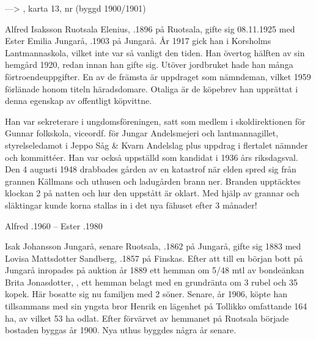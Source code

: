 ---> , karta 13, nr   (byggd 1900/1901)


Alfred Isaksson Ruotsala Elenius, .1896 på Ruotsala, gifte sig 08.11.1925 med Ester Emilia Jungarå, .1903 på Jungarå. År 1917 gick han i Korsholms Lantmannaskola, vilket inte var så vanligt den tiden. Han övertog hälften av sin hemgård 1920, redan innan han gifte sig.
Utöver jordbruket hade han många förtroendeuppgifter. En av de främsta är uppdraget som nämndeman, vilket 1959 förlänade honom titeln häradsdomare. Otaliga är de köpebrev han upprättat i denna egenskap av offentligt köpvittne.

Han var sekreterare i ungdomsföreningen, satt som medlem i skoldirektionen för Gunnar folkskola, viceordf. för Jungar Andelsmejeri och lantmannagillet, styrelseledamot i Jeppo Såg \& Kvarn Andelslag plus uppdrag i flertalet nämnder och kommittéer. Han var också uppställd som kandidat i 1936 års riksdagsval. Den 4 augusti 1948 drabbades gården av en katastrof när elden spred sig från grannen Källmans och uthusen och ladugården brann ner. Branden upptäcktes klockan 2 på natten och hur den uppstått är oklart. Med hjälp av grannar och släktingar kunde korna stallas in i det nya fähuset efter 3 månader!
\begin{jhchildren}
  \item {}
  \item {}
  \item {}
  \item {}
  \item {}
  \item {}
  \item {}
\end{jhchildren}
Alfred .1960  --  Ester .1980


Isak Johansson Jungarå, senare Ruotsala, .1862 på Jungarå, gifte sig 1883 med Lovisa Mattsdotter Sandberg, .1857 på Finskas. Efter att till en början bott på Jungarå inropades på auktion år 1889 ett hemman om 5/48 mtl av bondeänkan Brita Jonasdotter, , ett hemman belagt med en grundränta om 3 rubel och 35 kopek. Här bosatte sig nu familjen med 2 söner. Senare, år 1906, köpte han tillsammans med sin yngsta bror Henrik en lägenhet på Tollikko omfattande 164 ha, av vilket 53 ha odlat. Efter förvärvet av hemmanet på Ruotsala började bostaden byggas år 1900. Nya uthus byggdes några år senare.

